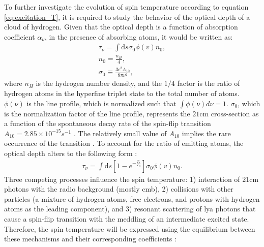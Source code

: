 \documentclass[12pt, TexShade, letterpaper]{report}
\begin{document}

To further investigate the evolution of spin temperature according to equation \ref{eq:excitation_T}, it is required to study the behavior of the optical depth of a cloud of hydrogen. Given that the optical depth is a function of absorption coefficient $\alpha_\nu$, in the presence of absorbing atoms, it would be written as:
\begin{gather}
    \tau_\nu=\int \mathrm{d} s \sigma_0 \phi(v) n_0 ,\\
    n_0 =\frac{n_H}{4},\\
    \sigma_0 \equiv \frac{3c^2 A_{10}}{8\pi \nu^2},
\end{gather}
where $n_H$ is the hydrogen number density, and the $1/4$ factor is the ratio of hydrogen atoms in the hyperfine triplet state to the total number of atoms. $\phi(\nu)$ is the line profile, which is normalized such that $\int \phi \left(\nu\right) d\nu=1$. $\sigma_0$, which is the normalization factor of the line profile, represents the $\mathrm{21cm}$ cross-section as a function of the spontaneous decay rate of the spin-flip transition $A_{10} = 2.85 \times 10^{-15} s^{-1}$ \cite{21century, low_frequency}. The relatively small value of $A_{10}$ implies the rare occurrence of the transition \cite{kit_thesis}. To account for the ratio of emitting atoms, the optical depth alters to the following form \cite{21century, low_frequency}:
\begin{gather}
    \tau_\nu=\int \mathrm{d} s\left[1- e^{ -\frac {T_*}{ T_S}}\right] \sigma_0 \phi(v) n_0.
\end{gather}
Three competing processes influence the spin temperature: 1) interaction of $\mathrm{21cm}$ photons with the radio background (mostly \gls{cmb}), 2) collisions with other particles (a mixture of hydrogen atoms, free electrons, and protons with hydrogen atoms as the leading component), and 3) resonant scattering of \gls{lya} photons that cause a spin-flip transition with the meddling of an intermediate excited state. Therefore, the spin temperature will be expressed using the equilibrium between these mechanisms and their corresponding coefficients \cite{low_frequency,21century}:
\end{document}
